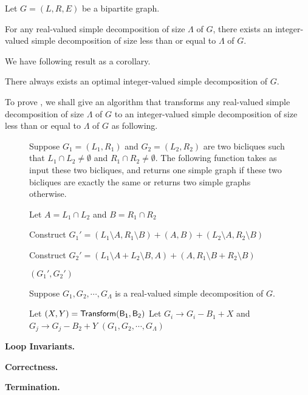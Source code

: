 \noindent Let $ G = (L,R,E) $ be a bipartite graph. 

\begin{theorem} \label{thm:reduction}
	For any real-valued simple decomposition of size $ \Lambda $ of $ G $, there exists an integer-valued simple decomposition of size less than or equal to $ \Lambda $ of $ G $. 
\end{theorem}

\noindent We have following result as a corollary.
\begin{corollary}
	There always exists an optimal integer-valued simple decomposition of $ G $.
\end{corollary}

\noindent To prove , we shall give an algorithm that transforms any real-valued simple decomposition of size $ \Lambda $ of $ G $ to an integer-valued simple decomposition of size less than or equal to $ \Lambda $ of $ G $ as following.
\begin{figure}
	\begin{boxedalgo}
	 Suppose $ G_1 = (L_1,R_1) $ and $ G_2 =  (L_2, R_2) $ are two bicliques such that $ L_1 \cap L_2 \neq \emptyset $ and $ R_1 \cap R_2 \neq \emptyset $. The following function takes as input these two bicliques, and returns one simple graph if these two bicliques are exactly the same or returns two simple graphs otherwise. 
		\begin{algorithmic}
			
			\State Let $ A = L_1 \cap L_2 $ and $ B = R_1 \cap R_2 $
			
			\State Construct $ G_1' = (L_1 \setminus A, R_1 \setminus B) + (A, B) + (L_2 \setminus A, R_2 \setminus B)$ 
			
			\State Construct $ G_2' = (L_1 \setminus A + L_2 \setminus B, A) + (A, R_1 \setminus B + R_2 \setminus B) $
			
			\State \Return $(G_1', G_2')$
			\EndFunction
		\end{algorithmic}
	\end{boxedalgo}
\end{figure}

\begin{figure}
\begin{boxedalgo}
	Suppose $ G_1, G_2, \cdots, G_\Lambda $ is a real-valued simple decomposition of $ G $.
	\begin{algorithmic}
	\Function{{\sf OPT-INT-SP}}{$G, ( G_1, G_2, \cdots, G_\Lambda)$}
	 {}
		\State Let $ (X, Y) = \sf Transform(B_1, B_2)  $
		\State Let $ G_i \rightarrow  G_i - B_1 + X $ and $ G_j \rightarrow G_j - B_2 + Y $
	\EndWhile
	\State \Return $ (G_1, G_2, \cdots, G_{\Lambda}) $ 
	\EndFunction
	\end{algorithmic}
\end{boxedalgo}
\end{figure}

\noindent \bf{Loop Invariants.} 

\noindent \bf{Correctness.}

\noindent \bf{Termination.}